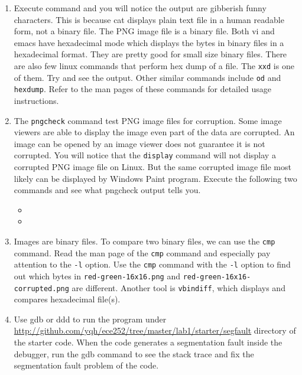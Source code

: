 \begin{enumerate}
    \item Execute  command and you will notice the output are gibberish funny characters. This is because cat displays plain text file in a human readable form, not a binary file. The PNG image file is a binary file. Both vi and emacs have hexadecimal mode which displays the bytes in binary files in a hexadecimal format. They are pretty good for small size binary files. There are also few linux commands that perform hex dump of a file. The \verb+xxd+ is one of them. Try  and see the output. Other similar commands include \verb+od+ and \verb+hexdump+. Refer to the man pages of these commands for detailed usage instructions. 
    \item The \verb+pngcheck+ command test PNG image files for corruption. Some image viewers are able to display the image even part of the data are corrupted. An image can be opened by an image viewer does not guarantee it is not corrupted. You will notice that the \verb+display+ command will not display a corrupted PNG image file on Linux. But the same corrupted image file most likely can be displayed by Windows Paint program. Execute the following two commands and see what pngcheck output tells you.
      \begin{itemize}
      \item {}
      \item {}
      \end{itemize}
    \item Images are binary files. To compare two binary files, we can use the \verb+cmp+ command. Read the man page of the \verb+cmp+ command and especially pay attention to the \verb+-l+ option. Use the \verb+cmp+ command with the \verb+-l+ option to find out which bytes in \verb+red-green-16x16.png+ and \verb+red-green-16x16-corrupted.png+ are different. Another tool is \verb+vbindiff+, which displays and compares hexadecimal file(s).  
     \item Use gdb or ddd to run the program under \url{http://github.com/yqh/ece252/tree/master/lab1/starter/segfault} directory of the starter code. When the code generates a segmentation fault inside the debugger, run the gdb command  to see the stack trace and fix the segmentation fault problem of the code. 
\end{enumerate}

